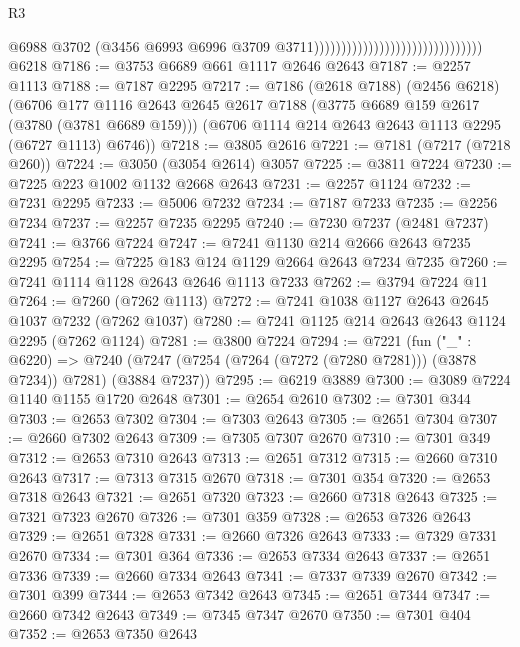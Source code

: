 \begin{lexlean}{R3}
\begin{coremodule}
                                                                @6988
                                                                @3702
                                                                (@3456
                                                                  @6993
                                                                  @6996
                                                                  @3709
                                                                  @3711)))))))))))))))))))))))))))))))
    @6218
@7186 := @3753 @6689 @661 @1117 @2646 @2643
@7187 := @2257 @1113
@7188 := @7187 @2295
@7217 := @7186
    (@2618 @7188)
    (@2456 @6218)
    (@6706
      @177
      @1116
      @2643
      @2645
      @2617
      @7188
      (@3775 @6689 @159 @2617 (@3780 (@3781 @6689 @159)))
      (@6706 @1114 @214 @2643 @2643 @1113 @2295 (@6727 @1113) @6746))
@7218 := @3805 @2616
@7221 := @7181 (@7217 (@7218 @260))
@7224 := @3050 (@3054 @2614) @3057
@7225 := @3811 @7224
@7230 := @7225 @223 @1002 @1132 @2668 @2643
@7231 := @2257 @1124
@7232 := @7231 @2295
@7233 := @5006 @7232
@7234 := @7187 @7233
@7235 := @2256 @7234
@7237 := @2257 @7235 @2295
@7240 := @7230 @7237 (@2481 @7237)
@7241 := @3766 @7224
@7247 := @7241 @1130 @214 @2666 @2643 @7235 @2295
@7254 := @7225 @183 @124 @1129 @2664 @2643 @7234 @7235
@7260 := @7241 @1114 @1128 @2643 @2646 @1113 @7233
@7262 := @3794 @7224 @11
@7264 := @7260 (@7262 @1113)
@7272 := @7241 @1038 @1127 @2643 @2645 @1037 @7232 (@7262 @1037)
@7280 := @7241 @1125 @214 @2643 @2643 @1124 @2295 (@7262 @1124)
@7281 := @3800 @7224
@7294 := @7221
    (fun ("_" : @6220) =>
    @7240 (@7247 (@7254 (@7264 (@7272 (@7280 @7281))) (@3878 @7234)) @7281) (@3884 @7237))
@7295 := @6219 @3889
@7300 := @3089 @7224 @1140 @1155 @1720 @2648
@7301 := @2654 @2610
@7302 := @7301 @344
@7303 := @2653 @7302
@7304 := @7303 @2643
@7305 := @2651 @7304
@7307 := @2660 @7302 @2643
@7309 := @7305 @7307 @2670
@7310 := @7301 @349
@7312 := @2653 @7310 @2643
@7313 := @2651 @7312
@7315 := @2660 @7310 @2643
@7317 := @7313 @7315 @2670
@7318 := @7301 @354
@7320 := @2653 @7318 @2643
@7321 := @2651 @7320
@7323 := @2660 @7318 @2643
@7325 := @7321 @7323 @2670
@7326 := @7301 @359
@7328 := @2653 @7326 @2643
@7329 := @2651 @7328
@7331 := @2660 @7326 @2643
@7333 := @7329 @7331 @2670
@7334 := @7301 @364
@7336 := @2653 @7334 @2643
@7337 := @2651 @7336
@7339 := @2660 @7334 @2643
@7341 := @7337 @7339 @2670
@7342 := @7301 @399
@7344 := @2653 @7342 @2643
@7345 := @2651 @7344
@7347 := @2660 @7342 @2643
@7349 := @7345 @7347 @2670
@7350 := @7301 @404
@7352 := @2653 @7350 @2643

\end{coremodule}
\end{lexlean}
